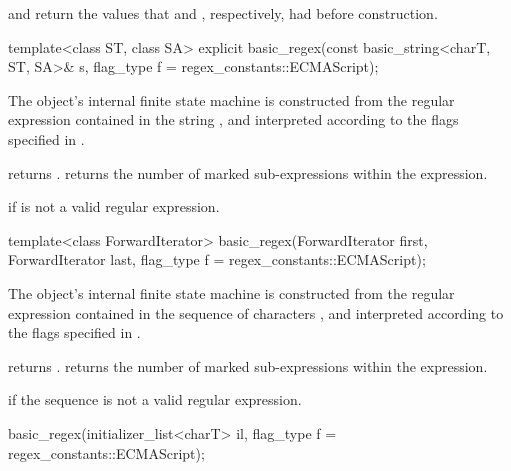 \begin{itemdescr}
\pnum
\ensures
{} and  return the values that
 and , respectively, had before construction.
\end{itemdescr}

%
\begin{itemdecl}
template<class ST, class SA>
  explicit basic_regex(const basic_string<charT, ST, SA>& s,
                       flag_type f = regex_constants::ECMAScript);
\end{itemdecl}

\begin{itemdescr}
\pnum
\effects
The object's internal finite state machine
is constructed from the regular expression contained in
the string , and
interpreted according to the flags specified in .

\pnum
\ensures
{} returns .
 returns the number of marked sub-expressions
within the expression.

\pnum
\throws
{} if  is not a valid regular expression.
\end{itemdescr}

%
\begin{itemdecl}
template<class ForwardIterator>
  basic_regex(ForwardIterator first, ForwardIterator last,
              flag_type f = regex_constants::ECMAScript);
\end{itemdecl}

\begin{itemdescr}
\pnum
\effects
The object's internal finite state machine
is constructed from the regular expression contained in
the sequence of characters , and
interpreted according to the flags specified in .

\pnum
\ensures
{} returns .
 returns the number of marked sub-expressions
within the expression.

\pnum
\throws
{} if the sequence  is not a
valid regular expression.
\end{itemdescr}

%
\begin{itemdecl}
basic_regex(initializer_list<charT> il, flag_type f = regex_constants::ECMAScript);
\end{itemdecl}

